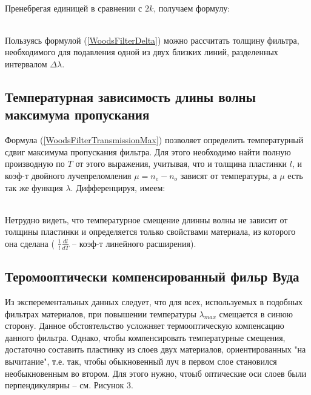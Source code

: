  \\

Пренебрегая единицей в сравнении с $ 2k $, получаем формулу:

 \\

Пользуясь формулой (\ref{WoodsFilterDelta}) можно рассчитать толщину фильтра, необходимого
для подавления одной из двух близких линий, разделенных интервалом $ \Delta\lambda $.

\newpage

\subsection{Температурная зависимость длины волны максимума пропускания}

Формула (\ref{WoodsFilterTransmissionMax}) позволяет определить температурный сдвиг
максимума пропускания фильтра. Для этого необходимо найти полную производную по $ T $
от этого выражения, учитывая, что и толщина пластинки $ l $, и коэф-т двойного
лучепреломления $ \mu = n_e - n_o $ зависят от температуры, а $ \mu $ есть так же
функция $ \lambda $. Дифференцируя, имеем:

 \\

Нетрудно видеть, что температурное смещение длинны волны не зависит от толщины пластинки
и определяется только свойствами материала, из которого она сделана (
$ \frac{1}{l} \frac{dl}{dT} $ -- коэф-т линейного расширения).

\subsection{Теромооптически компенсированный фильр Вуда}

Из эксперементальных данных следует, что для всех, используемых в подобных фильтрах
материалов, при повышении температуры $ \lambda_{max} $ смещается в синюю сторону.
Данное обстоятельство усложняет термооптическую компенсацию данного фильтра.
Однако, чтобы компенсировать температурные смещения, достаточно составить пластинку из
слоев двух материалов, ориентированных "на вычитание", т.е. так, чтобы обыкновенный
луч в первом слое становился необыкновенным во втором. Для этого нужно, чтоыб оптические
оси слоев были перпендикулярны -- см. Рисунок 3.


